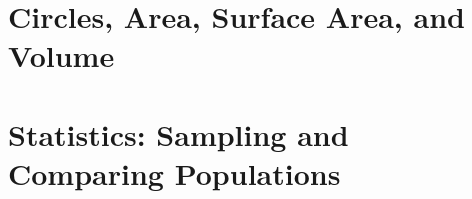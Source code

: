\documentclass[12pt, fleqn, openany, oneside]{studyGuide}
\begin{document}
\chapter{Circles, Area, Surface Area, and Volume}








\chapter{Statistics: Sampling and Comparing Populations}






\printAnswerKey
\end{document}
